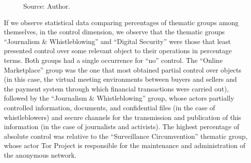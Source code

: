 \begin{figure}[H]
\caption*{Source: Author.}
\end{figure}

If we observe statistical data comparing percentages of thematic groups among themselves, in the control dimension, we observe that the thematic groups ``Journalism \& Whistleblowing'' and ``Digital Security'' were those that least presented control over some relevant object to their operations in percentage terms. Both groups had a single occurrence for ``no'' control. The ``Online Marketplace'' group was the one that most obtained partial control over objects (in this case, the virtual meeting environments between buyers and sellers and the payment system through which financial transactions were carried out), followed by the ``Journalism \& Whistleblowing'' group, whose actors partially controlled information, documents, and confidential files (in the case of whistleblowers) and secure channels for the transmission and publication of this information (in the case of journalists and activists). The highest percentage of absolute control was relative to the ``Surveillance Circumvention'' thematic group, whose actor Tor Project is responsible for the maintenance and administration of the anonymous network.

